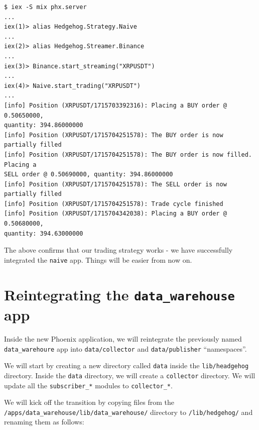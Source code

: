 \documentclass[
  oneside]{book}
\begin{document}
\begin{verbatim}
$ iex -S mix phx.server
...
iex(1)> alias Hedgehog.Strategy.Naive
...
iex(2)> alias Hedgehog.Streamer.Binance
...
iex(3)> Binance.start_streaming("XRPUSDT")
...
iex(4)> Naive.start_trading("XRPUSDT")
...
[info] Position (XRPUSDT/1715703392316): Placing a BUY order @ 0.50650000,
quantity: 394.86000000
[info] Position (XRPUSDT/1715704251578): The BUY order is now partially filled
[info] Position (XRPUSDT/1715704251578): The BUY order is now filled. Placing a
SELL order @ 0.50690000, quantity: 394.86000000
[info] Position (XRPUSDT/1715704251578): The SELL order is now partially filled
[info] Position (XRPUSDT/1715704251578): Trade cycle finished
[info] Position (XRPUSDT/1715704342038): Placing a BUY order @ 0.50680000,
quantity: 394.63000000
\end{verbatim}

The above confirms that our trading strategy works - we have successfully integrated the \texttt{naive} app. Things will be easier from now on.

\section{\texorpdfstring{Reintegrating the \texttt{data\_warehouse} app}{Reintegrating the data\_warehouse app}}\label{reintegrating-the-data_warehouse-app}

Inside the new Phoenix application, we will reintegrate the previously named \texttt{data\_warehoure} app into \texttt{data/collector} and \texttt{data/publisher} ``namespaces''.

We will start by creating a new directory called \texttt{data} inside the \texttt{lib/headgehog} directory. Inside the \texttt{data} directory, we will create a \texttt{collector} directory. We will update all the \texttt{subscriber\_*} modules to \texttt{collector\_*}.

We will kick off the transition by copying files from the \texttt{/apps/data\_warehouse/lib/data\_warehouse/} directory to \texttt{/lib/hedgehog/} and renaming them as follows:
\end{document}
